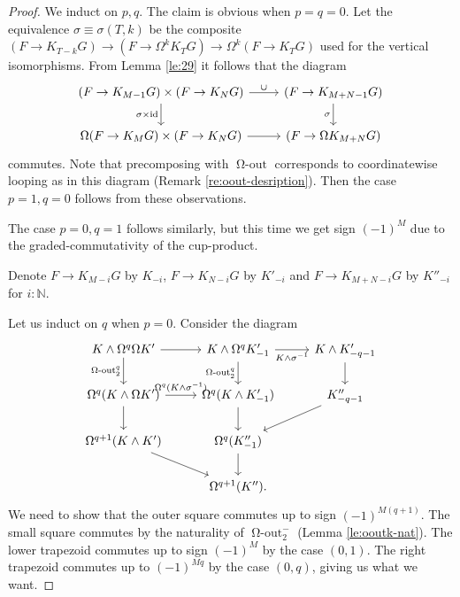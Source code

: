 \documentclass{amsart}
\theoremstyle{definition}
\newcommand{\id}{\operatorname{id}}
\newcommand{\NN}{\mathbb{N}}
\newcommand{\oout}{\operatorname{\Omega-out}}
\newcommand{\ooutk}[1]{\operatorname{\Omega-out}^{#1}}
\begin{document}
\begin{proof}
    We induct on $p, q$. The claim is obvious when $p=q=0$.
    Let the equivalence $\sigma \equiv \sigma(T,k)$ be the composite $(F \to K_{T-k}G) \to (F \to \Omega^k  K_TG) \to \Omega^k (F \to K_TG)$ used for the vertical isomorphisms.
    From Lemma \ref{le:29} it follows that the diagram
    \[\begin{tikzcd}
    	{(F \to K_{M-1}G) \times (F \to K_{N}G)} & {(F \to K_{M+N-1}G)} \\
    	{\Omega(F \to K_{M}G) \times (F \to K_{N}G)} & {(F \to \Omega K_{M+N}G)}
    	\arrow["\cup", from=1-1, to=1-2]
    	\arrow["{\sigma \times \id}"', from=1-1, to=2-1]
    	\arrow["\sigma"', from=1-2, to=2-2]
    	\arrow[from=2-1, to=2-2]
    \end{tikzcd}\]
    commutes.
    Note that precomposing with $\oout$ corresponds to coordinatewise looping as in this diagram (Remark \ref{re:oout-desription}).
    Then the case $p = 1, q = 0$ follows from these observations.

    The case $p = 0, q=1$ follows similarly, but this time we get sign $(-1)^M$ due to the graded-commutativity of the cup-product.

    Denote $F \to K_{M-i}G$ by $K_{-i}$, $F \to K_{N-i} G$ by $K'_{-i}$ and $F \to K_{M+N-i} G$ by $K''_{-i}$ for $i : \NN$.

    Let us induct on $q$ when $p = 0$.
        Consider the diagram
    \[\begin{tikzcd}
    	{K \wedge \Omega^q \Omega K'} & {K_{} \wedge \Omega^qK'_{-1}} & {K_{} \wedge K'_{-q-1}} \\
    	{\Omega^{q} (K \wedge \Omega K')} & {\Omega^{q} (K_{} \wedge K'_{-1})} & {K''_{-q-1}} \\
    	{\Omega^{q+1} (K \wedge K')} & {\Omega^{q} (K''_{-1})} \\
    	& {\Omega^{q+1} (K'').}
    	\arrow[from=1-1, to=1-2]
    	\arrow["{\ooutk{q}_2}"', from=1-1, to=2-1]
    	\arrow["{K \wedge \sigma^{-1}}"', from=1-2, to=1-3]
    	\arrow["{\ooutk{q}_2}"', from=1-2, to=2-2]
    	\arrow[from=1-3, to=2-3]
    	\arrow["{\Omega^q (K \wedge \sigma^{-1})}", from=2-1, to=2-2]
    	\arrow[from=2-1, to=3-1]
    	\arrow[from=2-2, to=3-2]
    	\arrow[from=2-3, to=3-2]
    	\arrow[from=3-1, to=4-2]
    	\arrow[from=3-2, to=4-2]
    \end{tikzcd}\]
    We need to show that the outer square commutes up to sign $(-1)^{M(q+1)}$. The small square commutes by the naturality of $\ooutk{-}_2$ (Lemma \ref{le:ooutk-nat}). The lower trapezoid commutes up to sign $(-1)^{M}$ by the case $(0,1)$. The right trapezoid commutes up to $(-1)^{Mq}$ by the case $(0,q)$, giving us what we want.


\end{proof}
\end{document}
